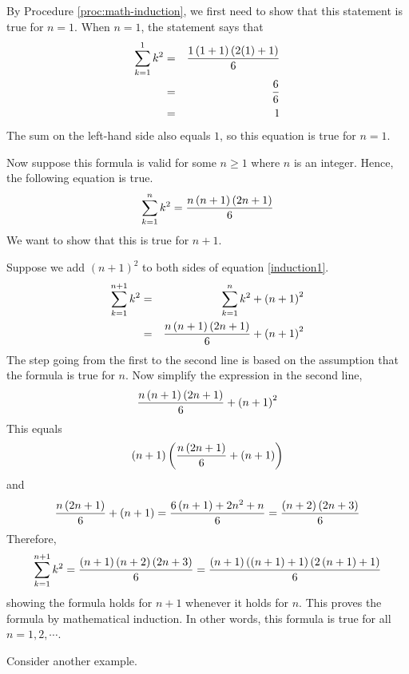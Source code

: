 \begin{solution}
By Procedure \ref{proc:math-induction}, we first need to show that this statement is true for $n=1$.
When $n=1$, the statement says that 
\begin{eqnarray*}
\sum_{k=1}^{1}k^{2}&=&\frac{1\left(1+1\right) \left(2(1)+1\right) }{6}\\
&=&\frac{6}{6} \\
&=& 1
\end{eqnarray*}
The sum on the left-hand side also equals $1$, so this equation is true for $n=1$.

Now suppose this formula is valid for some $n\geq
1$ where $n$ is an integer. Hence, the following equation is true.
\begin{equation}
\sum_{k=1}^{n}k^{2}=
\frac{n\left(n+1\right) \left(2n+1\right) }{6}
\label{induction1}
\end{equation}
We want to show that this is true for $n+1$. 

Suppose we add $(n+1)^2$ to both sides of equation \ref{induction1}.
\begin{eqnarray*}
\sum_{k=1}^{n+1}k^{2}&=&\sum_{k=1}^{n}k^{2}+\left(n+1\right) ^{2} \\
&=&\frac{n\left(n+1\right) \left(2n+1\right) }{6}+\left(n+1\right) ^{2}
\end{eqnarray*}
The step going from the first to the second line is based on the assumption
that the formula is true for $n.$
Now simplify the expression in the second line,
\begin{equation*}
\frac{n\left(n+1\right) \left(2n+1\right) }{6}+\left(n+1\right) ^{2}
\end{equation*}
This equals
\begin{equation*}
\left(n+1\right) \left(\frac{n\left(2n+1\right) }{6}+\left(n+1\right)
\right)
\end{equation*}
and
\begin{equation*}
\frac{n\left(2n+1\right) }{6}+\left(n+1\right) =\frac{6\left(n+1\right)
+2n^{2}+n}{6}=\frac{\allowbreak \left(n+2\right) \left(2n+3\right) }{6}
\end{equation*}
Therefore,
\begin{equation*}
\sum_{k=1}^{n+1}k^{2}=\frac{\allowbreak \left(n+1\right) \left(n+2\right)
\left(2n+3\right) }{6}=\frac{\allowbreak \left(n+1\right) \left(\left(
n+1\right) +1\right) \left(2\left(n+1\right) +1\right) }{6}
\end{equation*}
showing the formula holds for $n+1$ whenever it holds for $n.$ This proves
the formula by mathematical induction. In other words, this formula is true for all $n = 1, 2, \cdots$.
\end{solution}

Consider another example.

